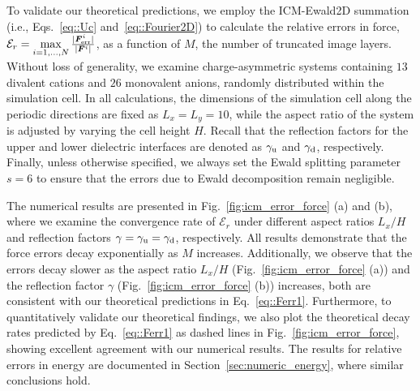 To validate our theoretical predictions, we employ the ICM-Ewald2D summation (i.e., Eqs.~\eqref{eq::Uc} and~\eqref{eq::Fourier2D}) to calculate the relative errors in force, $\mathcal{E}_r = \max\limits_{i=1,\ldots,N}\frac{\lvert\bm{F}^i_{\text{err}}\rvert}{\lvert\bm{F}^i\rvert}$, as a function of $M$, the number of truncated image layers.
Without loss of generality, we examine charge-asymmetric systems containing $13$ divalent cations and $26$ monovalent anions, randomly distributed within the simulation cell. 
In all calculations, the dimensions of the simulation cell along the periodic directions are fixed as $L_x = L_y = 10$, while the aspect ratio of the system is adjusted by varying the cell height $H$. 
Recall that the reflection factors for the upper and lower dielectric interfaces are denoted as $\gamma_{\text{u}}$ and $\gamma_{\text{d}}$, respectively. 
Finally, unless otherwise specified, we always set the Ewald splitting parameter $s=6$ to ensure that the errors due to Ewald decomposition remain negligible. 



The numerical results are presented in Fig.~\ref{fig:icm_error_force} (a) and (b), where we examine the convergence rate of $\mathcal{E}_r$ under different aspect ratios $L_x / H$ and reflection factors $\gamma=\gamma_{\text{u}}=\gamma_{\text{d}}$, respectively.
All results demonstrate that the force errors decay exponentially as $M$ increases. 
Additionally, we observe that the errors decay slower as the aspect ratio $L_x / H$ (Fig.~\ref{fig:icm_error_force} (a)) and the reflection factor $\gamma$ (Fig.~\ref{fig:icm_error_force} (b)) increases, both are consistent with our theoretical predictions in Eq.~\eqref{eq::Ferr1}. 
Furthermore, to quantitatively validate our theoretical findings, we also plot the theoretical decay rates predicted by Eq.~\eqref{eq::Ferr1} as dashed lines in Fig.~\ref{fig:icm_error_force}, showing excellent agreement with our numerical results.
The results for relative errors in energy are documented in Section~\ref{sec:numeric_energy}, where similar conclusions hold.  


